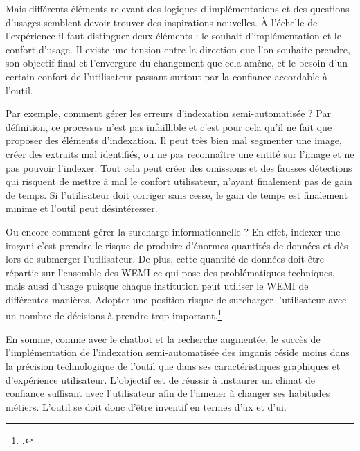 Mais différents éléments relevant des logiques d'implémentations et des questions d'usages semblent devoir trouver des inspirations nouvelles. À l'échelle de l'expérience il faut distinguer deux éléments : le souhait d'implémentation et le confort d'usage. Il existe une tension entre la direction que l'on souhaite prendre, son objectif final et l'envergure du changement que cela amène, et le besoin d'un certain confort de l'utilisateur passant surtout par la confiance accordable à l'outil. 

Par exemple, comment gérer les erreurs d'indexation semi-automatisée ? Par définition, ce processus n'est pas infaillible et c'est pour cela qu'il ne fait que proposer des éléments d'indexation. Il peut très bien mal segmenter une image, créer des extraits mal identifiés, ou ne pas reconnaître une entité sur l'image et ne pas pouvoir l'indexer. Tout cela peut créer des omissions et des fausses détections qui risquent de mettre à mal le confort utilisateur, n'ayant finalement pas de gain de temps. Si l’utilisateur doit corriger sans cesse, le gain de temps est finalement minime et l'outil peut désintéresser.

Ou encore comment gérer la surcharge informationnelle ? En effet, indexer une \gls{imgani} c'est prendre le risque de produire d'énormes quantités de données et dès lors de submerger l'utilisateur. De plus, cette quantité de données doit être répartie sur l'ensemble des \gls{WEMI} ce qui pose des problématiques techniques, mais aussi d'usage puisque chaque institution peut utiliser le \gls{WEMI} de différentes manières. Adopter une position  risque de surcharger l'utilisateur avec un nombre de décisions à prendre trop important.\footcite{epplerConceptInformationOverload2004}\newline

En somme, comme avec le \gls{chatbot} et la recherche augmentée, le succès de l'implémentation de l'indexation semi-automatisée des \glspl{imgani} réside moins dans la précision technologique de l'outil que dans ses caractéristiques graphiques et d'expérience utilisateur. L'objectif est de réussir à instaurer un climat de confiance suffisant avec l'utilisateur afin de l'amener à changer ses habitudes métiers. L’outil se doit donc d'être inventif en termes d'\gls{ux} et d'\gls{ui}.